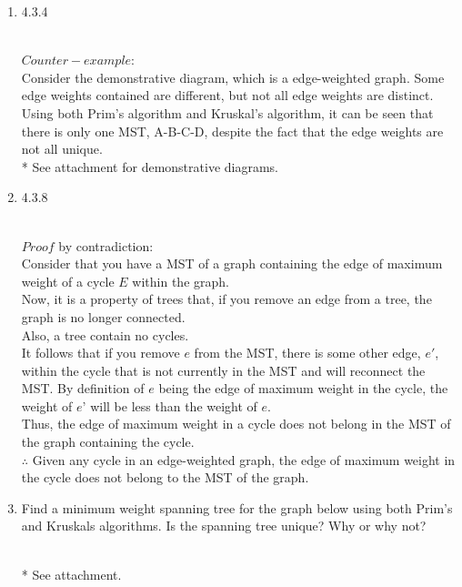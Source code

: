 \documentclass[11pt]{article}
\begin{document}
\begin{enumerate}
\item 4.3.4
\begin{solution}\\
$Counter-example$: \\
Consider the demonstrative diagram, which is a edge-weighted graph. Some edge weights contained are different, but not all edge weights are distinct. \\
Using both Prim’s algorithm and Kruskal’s algorithm, it can be seen that there is only one MST, A-B-C-D, despite the fact that the edge weights are not all unique. \\
* See attachment for demonstrative diagrams.
\end{solution}

\item 4.3.8
\begin{solution}\\
$Proof$ by contradiction: \\
Consider that you have a MST of a graph containing the edge of maximum weight of a cycle $E$ within the graph.  \\
Now, it is a property of trees that, if you remove an edge from a tree, the graph is no longer connected. \\
Also, a tree contain no cycles. \\
It follows that if you remove $e$ from the MST, there is some other edge, $e'$, within the cycle that is not currently in the MST and will reconnect the MST. By definition of $e$ being the edge of maximum weight in the cycle, the weight of $e’$ will be less than the weight of $e$.  \\
Thus, the edge of maximum weight in a cycle does not belong in the MST of the graph containing the cycle.\\
$\therefore$ Given any cycle in an edge-weighted graph, the edge of maximum weight in the cycle does not belong to the MST of the graph. 
\end{solution}

\item Find a minimum weight spanning tree for the graph below using both Prim's and Kruskals algorithms. Is the spanning tree unique? Why or why not?
\begin{solution}\\
* See attachment.
\end{solution}

\end{enumerate}
\end{document}
